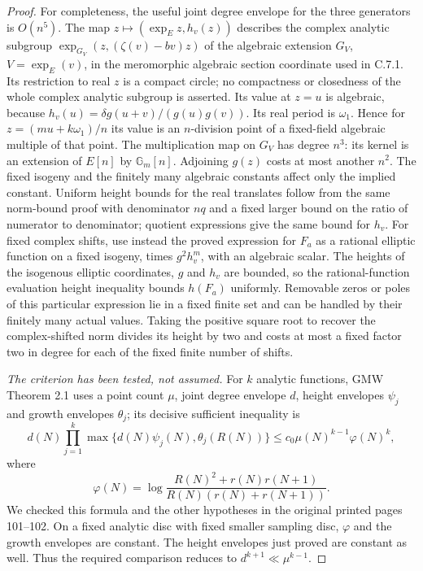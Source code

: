 \begin{proof}
For completeness, the useful joint degree envelope for the
three generators is $O(n^5)$.  The map
$z\mapsto(\exp_Ez,h_v(z))$ describes the complex analytic
subgroup $\exp_{G_V}(z,(\zeta(v)-bv)z)$ of the algebraic
extension $G_V$, $V=\exp_E(v)$, in the meromorphic algebraic
section coordinate used in C.7.1.  Its restriction to real
$z$ is a compact circle; no compactness or closedness of the
whole complex analytic subgroup is asserted.
Its value at $z=u$ is algebraic, because
$h_v(u)=\delta g(u+v)/(g(u)g(v))$.
Its real period is $\omega_1$.  Hence for
$z=(mu+k\omega_1)/n$ its value is an $n$-division point of
a fixed-field algebraic multiple of that point.
The multiplication map on $G_V$ has degree $n^3$: its kernel
is an extension of $E[n]$ by $\mathbb G_m[n]$.
Adjoining $g(z)$ costs at most another $n^2$.
The fixed isogeny and the finitely many algebraic constants
affect only the implied constant.  Uniform height bounds for
the real translates follow from the same norm-bound proof with
denominator $nq$ and a fixed larger bound on the ratio of
numerator to denominator; quotient expressions give the same
bound for $h_v$.  For fixed complex shifts, use instead the
proved expression for $F_a$ as a rational elliptic function
on a fixed isogeny, times $g^2h_v^m$, with an algebraic scalar.
The heights of the isogenous elliptic coordinates, $g$ and
$h_v$ are bounded, so the rational-function evaluation height
inequality bounds $h(F_a)$ uniformly.  Removable zeros or poles
of this particular expression lie in a fixed finite set and
can be handled by their finitely many actual values.  Taking
the positive square root to recover the complex-shifted norm
divides its height by two and costs at most a fixed factor two
in degree for each of the fixed finite number of shifts.

\emph{The criterion has been tested, not assumed.}
For $k$ analytic functions, GMW Theorem 2.1 uses a point count
$\mu$, joint degree envelope $d$, height envelopes $\psi_j$
and growth envelopes $\theta_j$; its decisive sufficient
inequality is
\[
 d(N)\prod_{j=1}^k
  \max\{d(N)\psi_j(N),\theta_j(R(N))\}
 \leq c_0\mu(N)^{k-1}\varphi(N)^k,
\]
where
\[
 \varphi(N)=\log
 \frac{R(N)^2+r(N)r(N+1)}
      {R(N)(r(N)+r(N+1))}.
\]
We checked this formula and the other hypotheses in the
original printed pages 101--102.  On a fixed analytic disc
with fixed smaller sampling disc, $\varphi$ and the growth
envelopes are constant.  The height envelopes just proved
are constant as well.  Thus the required comparison reduces
to $d^{k+1}\ll\mu^{k-1}$.


\end{proof}
